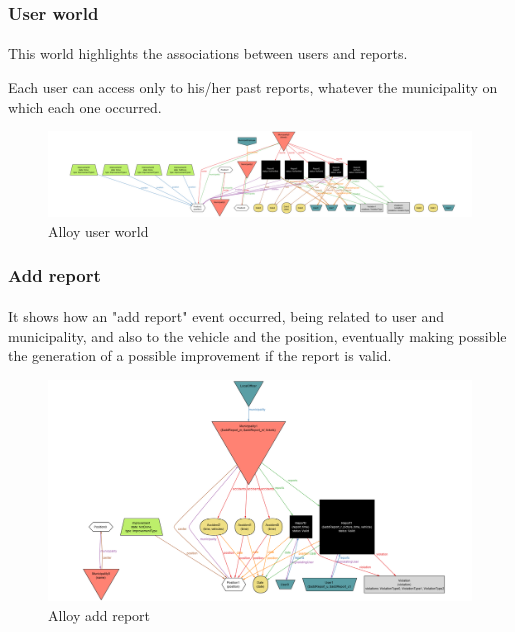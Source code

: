 			\subsubsection{User world}
				\paragraph{}
					This world highlights the associations between users and reports.
					
					Each user can access only to his/her past reports, whatever the municipality on which each one occurred.
					\begin{figure}[!h]
						\includegraphics[width=\textwidth]{images/Alloy/UserWorld.png}
						\caption{Alloy user world}
					\end{figure}
			\subsubsection{Add report}
				\paragraph{}
					It shows how an "add report" event occurred, being related to user and municipality, and also to the vehicle and the position, eventually making possible the generation of a possible improvement if the report is valid.
					\begin{figure}[!h]
						\includegraphics[width=\textwidth]{images/Alloy/AddReport.png}
						\caption{Alloy add report}
					\end{figure}
	